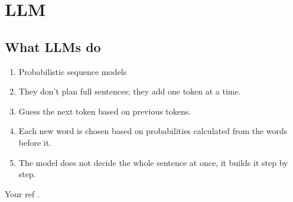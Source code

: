 \documentclass[../../main.tex]{subfiles}
\begin{document}
\chapter{LLM}


% 
% 

\section{What LLMs do}
	\begin{enumerate}
		\item Probabilistic sequence models
		\item They don’t plan full sentences; they add one token at a time.
		\item Guess the next token based on previous tokens.
		\item Each new word is chosen based on probabilities calculated from the words before it.
		\item The model does not decide the whole sentence at once, it builds it step by step.
	\end{enumerate}
Your ref \parencite{Hang2024}.
\end{document}
